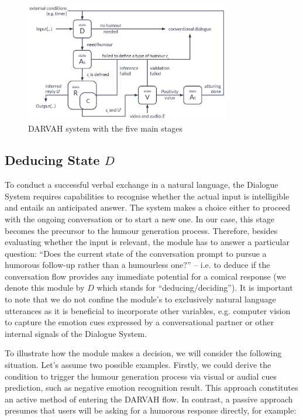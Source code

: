 \begin{figure}[htpb]
  \centering
  \includegraphics[width=0.8\textwidth]{figures/darvah.png}
  \caption{DARVAH system with the five main stages} \label{fig:darvah}
\end{figure}

\subsection{Deducing State \texorpdfstring{\( D\)}{D}}\label{subs:D}

To conduct a successful verbal exchange in a natural language, the Dialogue System requires capabilities to recognise whether the actual input is intelligible and entails an anticipated answer. The system makes a choice either to proceed with the ongoing conversation or to start a new one. In our case, this stage becomes the precursor to the humour generation process. Therefore, besides evaluating whether the input is relevant, the module has to answer a particular question: “Does the current state of the conversation prompt to pursue a humorous follow-up rather than a humourless one?” – i.e. to deduce if the conversation flow provides any immediate potential for a comical response (we denote this module by \( D\) which stands for “deducing/deciding”). It is important to note that we do not confine the module’s to exclusively natural language utterances as it is beneficial to incorporate other variables, e.g. computer vision to capture the emotion cues expressed by a conversational partner or other internal signals of the Dialogue System. \par
    
To illustrate how the module makes a decision, we will consider the following situation. Let’s assume two possible examples. Firstly, we could derive the condition to trigger the humour generation process via visual or audial cues prediction, such as negative emotion recognition result. This approach constitutes an active method of entering the DARVAH flow. In contrast, a passive approach presumes that users will be asking for a humorous response directly, for example:

